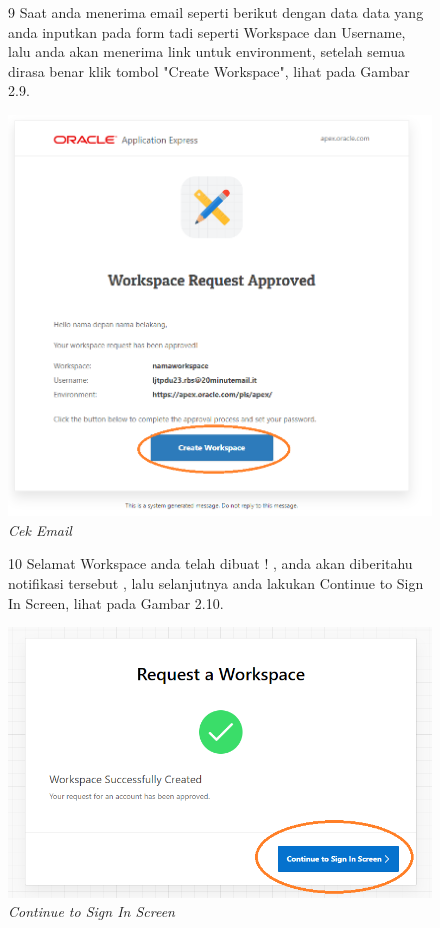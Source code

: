 \begin{itemize}
        \begin{figure}[!htbp]
        \item[9]Saat anda menerima email seperti berikut dengan data data yang anda inputkan pada form tadi seperti Workspace dan Username, lalu anda akan menerima link untuk environment, setelah semua dirasa benar klik tombol "Create Workspace", lihat pada Gambar 2.9.
        \begin{center}
        \includegraphics[scale=0.5]{figures/9.png}
        \caption{\textit{Cek Email}}
        \end{center}
        \end{figure}
        
        \begin{figure}[!htbp]
        \item[10]Selamat Workspace anda telah dibuat ! , anda akan diberitahu notifikasi tersebut , lalu selanjutnya anda lakukan Continue to Sign In Screen, lihat pada Gambar 2.10.
        \begin{center}
        \includegraphics[scale=0.5]{figures/10.png}
        \caption{\textit{Continue to Sign In Screen}}
        \end{center}
        \end{figure}
        

\end{itemize}
